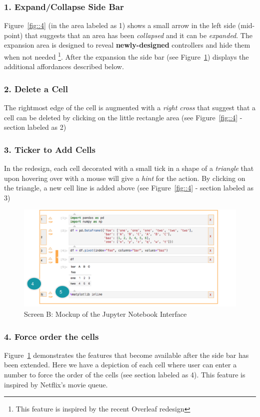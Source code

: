 \documentclass[12pt,letterpaper]{article}
\begin{document}
\subsubsection*{1. Expand/Collapse Side Bar}
Figure~\ref{fig::4} (in the area labeled as 1) shows a small arrow in the left side (mid-point) that suggests that an area has been \textit{collapsed} and it can be \textit{expanded}. The expansion area is designed to reveal \textbf{newly-designed} controllers and hide them when not needed \footnote{This feature is inspired by the recent Overleaf redesign}. After the expansion the side bar (see Figure~\ref{fig::5}) displays the additional affordances described below.

\subsubsection*{2. Delete a Cell}
The rightmost edge of the cell is augmented with a \textit{right cross}  that suggest that a cell can be deleted by clicking on the little rectangle area (see Figure~\ref{fig::4} - section labeled as 2)

\subsubsection*{3. Ticker to Add Cells}
In the redesign, each cell decorated with a small tick in a shape of a \textit{triangle} that upon hovering over with a mouse will give a \textit{hint} for the action. By clicking on the triangle, a new cell line is added above (see Figure~\ref{fig::4} - section labeled as 3)

\begin{figure}[hbt!]
\centering
\includegraphics[scale=.5]{figures/project-principles/jupyter_mock_screen_b.png}
\caption{Screen B: Mockup of the Jupyter Notebook Interface}
\label{fig::5}
\end{figure}

\subsubsection*{4. Force order the cells}
Figure~\ref{fig::5} demonstrates the features that become available after the side bar has been extended. Here we have a depiction of each cell where user can enter a number to force the order of the cells (see section labeled as 4). This feature is inspired by Netflix's movie queue. 
\end{document}
